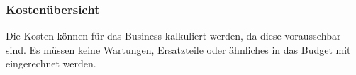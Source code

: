 \subsubsection{Kostenübersicht}
Die Kosten können für das Business kalkuliert werden, da diese voraussehbar sind.
Es müssen keine Wartungen, Ersatzteile oder ähnliches in das Budget mit eingerechnet werden.



